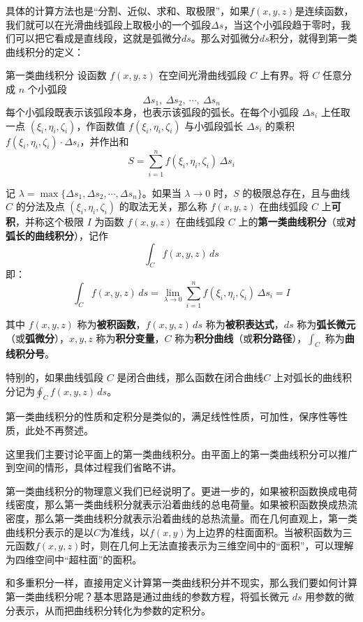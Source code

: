 具体的计算方法也是“分割、近似、求和、取极限”，如果\(f(x,y,z)\)是连续函数，我们就可以在光滑曲线弧段上取极小的一个弧段\(\Delta s\)，当这个小弧段趋于零时，我们可以把它看成是直线段，这就是弧微分\(ds\)。那么对弧微分\(ds\)积分，就得到第一类曲线积分的定义：
\begin{definition}{第一类曲线积分}{}
    设函数 \(f(x,y,z)\) 在空间光滑曲线弧段 \(C\) 上有界。将 \(C\) 任意分成 \(n\) 个小弧段
\[
\Delta s_1,\ \Delta s_2,\ \cdots,\ \Delta s_n
\]
每个小弧段既表示该弧段本身，也表示该弧段的弧长。在每个小弧段 \(\Delta s_i\) 上任取一点 \((\xi_i,\eta_i,\zeta_i)\)，作函数值 \(f(\xi_i,\eta_i,\zeta_i)\) 与小弧段弧长 \(\Delta s_i\) 的乘积 \(f(\xi_i,\eta_i,\zeta_i) \cdot \Delta s_i\)，并作出和
\[
S = \sum_{i=1}^{n} f(\xi_i,\eta_i,\zeta_i) \,\Delta s_i
\]

记 \(\lambda = \max\{\Delta s_1,\Delta s_2,\cdots,\Delta s_n\}\)。如果当 \(\lambda \to 0\) 时，\(S\) 的极限总存在，且与曲线 \(C\) 的分法及点 \((\xi_i,\eta_i,\zeta_i)\) 的取法无关，那么称 \(f(x,y,z)\) 在曲线弧段 \(C\) 上\textbf{可积}，并称这个极限 \(I\) 为函数 \(f(x,y,z)\) 在曲线弧段 \(C\) 上的\textbf{第一类曲线积分}（或\textbf{对弧长的曲线积分}），记作
\[
\int_{C} f(x,y,z)\,ds
\]
即：
\[
\int_{C} f(x,y,z)\,ds = \lim_{\lambda \to 0} \sum_{i=1}^{n} f(\xi_i,\eta_i,\zeta_i)\,\Delta s_i = I
\]

其中 \(f(x,y,z)\) 称为\textbf{被积函数}，\(f(x,y,z)\,ds\) 称为\textbf{被积表达式}，\(ds\) 称为\textbf{弧长微元}（或\textbf{弧微分}），\(x,y,z\) 称为\textbf{积分变量}，\(C\) 称为\textbf{积分曲线}（或\textbf{积分路径}），\(\int_C\) 称为\textbf{曲线积分号}。
\end{definition}
特别的，如果曲线弧段 \(C\) 是闭合曲线，那么函数在闭合曲线\(C\) 上对弧长的曲线积分记为\(\oint_C f(x,y,z)\,ds\)。

第一类曲线积分的性质和定积分是类似的，满足线性性质，可加性，保序性等性质，此处不再赘述。

这里我们主要讨论平面上的第一类曲线积分。由平面上的第一类曲线积分可以推广到空间的情形，具体过程我们省略不讲。

第一类曲线积分的物理意义我们已经说明了。更进一步的，如果被积函数换成电荷线密度，那么第一类曲线积分就表示沿着曲线的总电荷量。如果被积函数换成热流密度，那么第一类曲线积分就表示沿着曲线的总热流量。而在几何直观上，第一类曲线积分表示的是以\(C\)为准线，以\(f(x,y)\)为上边界的柱面面积。当被积函数为三元函数\(f(x,y,z)\)时，则在几何上无法直接表示为三维空间中的“面积”，可以理解为四维空间中“超柱面”的面积。

和多重积分一样，直接用定义计算第一类曲线积分并不现实，那么我们要如何计算第一类曲线积分呢？基本思路是通过曲线的参数方程，将弧长微元 \(ds\) 用参数的微分表示，从而把曲线积分转化为参数的定积分。

